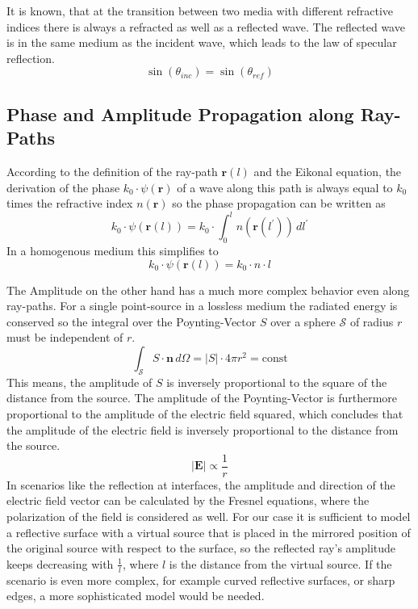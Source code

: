 It is known, that at the transition between two media with different refractive indices there is always a refracted as well as a reflected wave.
The reflected wave is in the same medium as the incident wave, which leads to the law of specular reflection.
\begin{equation}
    \sin(\theta_{inc}) = \sin(\theta_{ref})
\end{equation}


\subsection{Phase and Amplitude Propagation along Ray-Paths}
According to the definition of the ray-path \(\bm{r}(l)\) and the Eikonal equation, the derivation of the phase \(k_0 \cdot \psi(\bm{r})\) of a wave along this path is always equal to \(k_0\) times the refractive index \(n(\bm{r})\) so the phase propagation can be written as
\begin{equation}
    k_0 \cdot \psi(\bm{r}(l)) = k_0 \cdot \int_{0}^{l} n(\bm{r}(l^{\prime})) \, dl^{\prime}
\end{equation}
In a homogenous medium this simplifies to
\begin{equation}
    k_0 \cdot \psi(\bm{r}(l)) = k_0 \cdot n \cdot l
\end{equation}

The Amplitude on the other hand has a much more complex behavior even along ray-paths.
For a single point-source in a lossless medium the radiated energy is conserved so the integral over the Poynting-Vector \(S\) over a sphere \(\mathcal{S} \) of radius \(r\) must be independent of \(r\).
\begin{equation}
    \int_\mathcal{S}  S \cdot \bm{n} \, d\Omega = |S| \cdot 4\pi r^2 = \text{const}
\end{equation}
This means, the amplitude of \(S\) is inversely proportional to the square of the distance from the source.
The amplitude of the Poynting-Vector is furthermore proportional to the amplitude of the electric field squared, which concludes that the amplitude of the electric field is inversely proportional to the distance from the source.
\begin{equation}
    |\bm{E}| \propto \frac{1}{r}
\end{equation}
In scenarios like the reflection at interfaces, the amplitude and direction of the electric field vector can be calculated by the Fresnel equations, where the polarization of the field is considered as well.
For our case it is sufficient to model a reflective surface with a virtual source that is placed in the mirrored position of the original source with respect to the surface, so the reflected ray's amplitude keeps decreasing with \(\frac{1}{l}\), where \(l\) is the distance from the virtual source.
If the scenario is even more complex, for example curved reflective surfaces, or sharp edges, a more sophisticated model would be needed.

